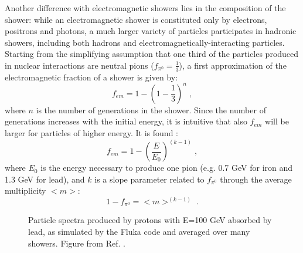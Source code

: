 Another difference with electromagnetic showers lies in the composition of the shower: while an electromagnetic shower is constituted only by electrons, positrons and photons, a much larger variety of particles participates in hadronic showers, including both hadrons and electromagnetically-interacting particles. Starting from the simplifying assumption that one third of the particles produced in nuclear interactions are neutral pions ($f_{\pi^0}=\frac{1}{3}$), a first approximation of the electromagnetic fraction of a shower is given by:
\begin{equation}
f_{em} = 1 - \left(1 - \frac{1}{3} \right)^n \; ,
\end{equation}
where $n$ is the number of generations in the shower. Since the number of generations increases with the initial energy, it is intuitive that also $f_{em}$ will be larger for particles of higher energy. It is found \cite{GABRIEL1994336}:
\begin{equation}
f_{em} = 1 - \left(\frac{E}{E_0}\right)^{\left( k-1 \right)} \; ,
\end{equation}
where $E_0$ is the energy necessary to produce one pion (e.g. 0.7 GeV for iron and 1.3 GeV for lead), and $k$ is a slope parameter related to $f_{\pi^0}$ through the average multiplicity $<m>$:
\begin{equation}
1-f_{\pi^0} = <m>^{\left( k-1 \right)} \;.
\end{equation}


\begin{figure}[ht]
\centering
{}
\caption{Particle spectra produced by protons with E=100 GeV absorbed by lead, as simulated by the Fluka code \cite{Ferrari:898301} and averaged over many showers. Figure from Ref. \cite{RevModPhys.75.1243}.}
\label{fig:det:shower_had_spectra}
\end{figure}

